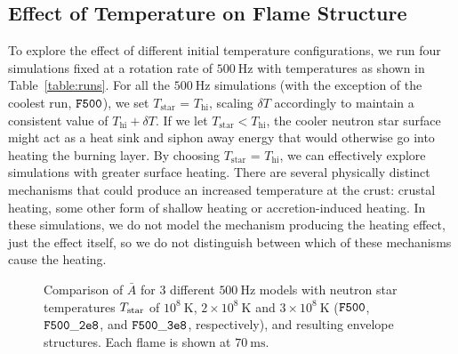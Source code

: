 \documentclass[preprint,times,tighten]{aastex63}
\begin{document}

\subsection{Effect of Temperature on Flame Structure}\label{ssec:temp_structure}

To explore the effect of different initial temperature configurations, we run four simulations fixed at a rotation rate of $500~\mathrm{Hz}$ with temperatures as shown in Table~\ref{table:runs}. For all the $500~\mathrm{Hz}$ simulations (with the exception of the coolest run, $\tt{F500}$), we set $T_\mathrm{star}$ = $T_\mathrm{hi}$, scaling $\delta T$ accordingly to maintain a consistent value of $T_\mathrm{hi} + \delta T$. If we let $T_\mathrm{star} < T_\mathrm{hi}$, the cooler neutron star surface might act as a heat sink and siphon away energy that would otherwise go into heating the burning layer. By choosing $T_\mathrm{star}$ = $T_\mathrm{hi}$, we can effectively explore simulations with greater surface heating. There are several physically distinct mechanisms that could produce an increased temperature at the crust: crustal heating, some other form of shallow heating or accretion-induced heating. In these simulations, we do not model the mechanism producing the heating effect, just the effect itself, so we do not distinguish between which of these mechanisms cause the heating.

\begin{figure}[t]
\centering
{}
\caption{\label{fig:compare_500Hz_abar} Comparison of $\bar{A}$ for 3 different $500~\mathrm{Hz}$ models with neutron star temperatures $T_{\rm star}$ of $10^8~\mathrm{K}$, $2\times10^8~\mathrm{K}$ and $3\times10^8~\mathrm{K}$ ($\tt{F500}$, $\tt{F500\_2e8}$, and $\tt{F500\_3e8}$, respectively), and resulting envelope structures.  Each flame is shown at $70~\mathrm{ms}$.} 
\end{figure}
\end{document}
